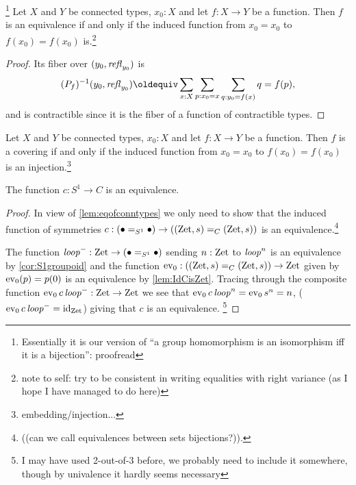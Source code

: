 \begin{lemma}\label{lem:eqofconntypes}\footnote{
Essentially it is our version of ``a group homomorphism is an isomorphism iff it is a bijection'': proofread}
  Let $X$ and $Y$ be connected types, $x_0:X$ and let $f:X\to Y$ be a function.  Then $f$ is an equivalence if and only if the induced function from $x_0=x_0$ to $f(x_0)=f(x_0)$ is.\footnote{note to self: try to be consistent in writing equalities with right variance (as I hope I have managed to do here)}
\end{lemma}
\begin{proof}
  

 Its fiber over $(y_0,\mathop{{\it refl}_{y_0}})$ is 
$$(P_f)^{-1}(y_0,\refl{y_0})\oldequiv\sum_{x:X}\sum_{p:x_0=x}\sum_{q:y_0=f(x)}q=f(p),$$ and is contractible since it is the fiber of a function of contractible types.  
\end{proof}
\begin{lemma}
  Let $X$ and $Y$ be connected types, $x_0:X$ and let $f:X\to Y$ be a function.  Then $f$ is a covering if and only if the induced function from $x_0=x_0$ to $f(x_0)=f(x_0)$ is an injection.\footnote{embedding/injection...}
\end{lemma}



\begin{theorem}\label{thm:S1bysymmetries}
  The function $c:S^1\to C$ is an equivalence.
\end{theorem}
\begin{proof}
  In view of \cref{lem:eqofconntypes} we only need to show that the induced function of symmetries $c:(\bullet=_{S^1}\bullet)\to((\mathrm{Zet},s)=_C(\mathrm{Zet},s))$ is an equivalence.\footnote{ ((can we call equivalences between sets bijections?)).}  

The function $\mathit{loop}^-:\mathrm{Zet}\to (\bullet=_{S^1}\bullet)$ sending $n:\mathrm{Zet}$ to $\mathit{loop}^n$ is an equivalence by  \cref{cor:S1groupoid} and the function  $\mathrm{ev}_0:((\mathrm{Zet},s)=_C(\mathrm{Zet},s))\to \mathrm{Zet}$ given by $\mathrm{ev}_0(p)=p(0)$ is an equivalence by \cref{lem:IdCisZet}.  Tracing through the composite function $\mathrm{ev}_0\,c\,\mathit{loop}^-:\mathrm{Zet}\to\mathrm{Zet}$ we see that $\mathrm{ev}_0\,c\,\mathit{loop}^n=\mathrm{ev}_0\,s^n=n$, (\ie $\mathrm{ev}_0\,c\,\mathit{loop}^-=\mathord{\mathrm{id}}_{\mathrm{Zet}}$) giving that $c$ is an equivalence. 
\footnote{I may have used 2-out-of-3 before, we probably need to include it somewhere, though by univalence it hardly seems necessary}%
\end{proof}

